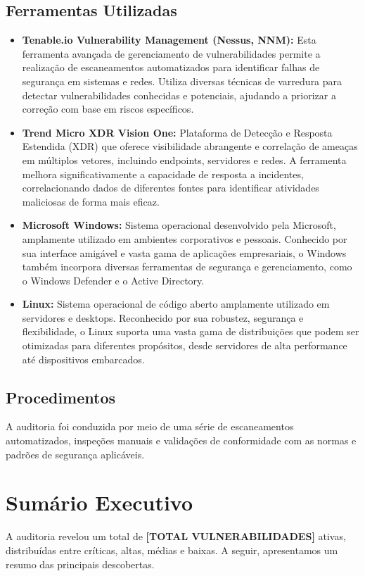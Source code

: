 \documentclass[a4paper,12pt]{article}
\begin{document}
\subsection{Ferramentas Utilizadas}
\begin{itemize}
    \item \textbf{Tenable.io Vulnerability Management (Nessus, NNM):} Esta ferramenta avançada de gerenciamento de vulnerabilidades permite a realização de escaneamentos automatizados para identificar falhas de segurança em sistemas e redes.
Utiliza diversas técnicas de varredura para detectar vulnerabilidades conhecidas e potenciais, ajudando a priorizar a correção com base em riscos específicos.
 \item \textbf{Trend Micro XDR Vision One:} Plataforma de Detecção e Resposta Estendida (XDR) que oferece visibilidade abrangente e correlação de ameaças em múltiplos vetores, incluindo endpoints, servidores e redes.
 A ferramenta melhora significativamente a capacidade de resposta a incidentes, correlacionando dados de diferentes fontes para identificar atividades maliciosas de forma mais eficaz.
 \item \textbf{Microsoft Windows:} Sistema operacional desenvolvido pela Microsoft, amplamente utilizado em ambientes corporativos e pessoais.
 Conhecido por sua interface amigável e vasta gama de aplicações empresariais, o Windows também incorpora diversas ferramentas de segurança e gerenciamento, como o Windows Defender e o Active Directory.
 \item \textbf{Linux:} Sistema operacional de código aberto amplamente utilizado em servidores e desktops.
 Reconhecido por sua robustez, segurança e flexibilidade, o Linux suporta uma vasta gama de distribuições que podem ser otimizadas para diferentes propósitos, desde servidores de alta performance até dispositivos embarcados.
 \end{itemize}

\subsection{Procedimentos}
A auditoria foi conduzida por meio de uma série de escaneamentos automatizados, inspeções manuais e validações de conformidade com as normas e padrões de segurança aplicáveis.
\section{Sumário Executivo}
A auditoria revelou um total de \textbf{[TOTAL VULNERABILIDADES]} ativas, distribuídas entre críticas, altas, médias e baixas.
A seguir, apresentamos um resumo das principais descobertas.
\end{document}

